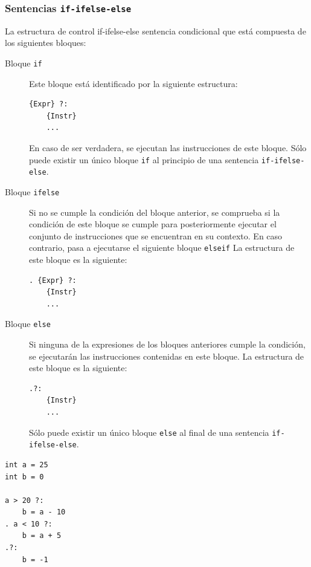 \documentclass[11pt, english]{article}
\begin{document}
\subsubsection{Sentencias \texttt{if-ifelse-else}}
La estructura de control if-ifelse-else sentencia condicional que está compuesta de los siguientes bloques:
\begin{description}
	\item[Bloque \texttt{if}] Este bloque está identificado por la siguiente estructura:
	\begin{center}
\begin{lstlisting}
{Expr} ?:
	{Instr}
	...
\end{lstlisting}
	\end{center}
	En caso de ser verdadera, se ejecutan las instrucciones de este bloque. Sólo puede existir un único bloque \texttt{if} al principio de una sentencia \texttt{if-ifelse-else}.
	\item[Bloque \texttt{ifelse}] Si no se cumple la condición del bloque anterior, se comprueba si la condición de este bloque se cumple para posteriormente ejecutar el conjunto de instrucciones que se encuentran en su contexto. En caso contrario, pasa a ejecutarse el siguiente bloque \texttt{elseif} La estructura de este bloque es la siguiente:
	\begin{center}
\begin{lstlisting}
. {Expr} ?:
	{Instr}
	...
\end{lstlisting}
	\end{center}
	\item[Bloque \texttt{else}] Si ninguna de la expresiones de los bloques anteriores cumple la condición, se ejecutarán las instrucciones contenidas en este bloque. La estructura de este bloque es la siguiente:
	\begin{center}
\begin{lstlisting}
.?:
	{Instr}
	...
\end{lstlisting}
	\end{center}
	Sólo puede existir un único bloque \texttt{else} al final de una sentencia \texttt{if-ifelse-else}.
\end{description}

\begin{lstlisting}[caption=Ejemplo de uso de la sentencia \texttt{if-ifelse-else}]
int a = 25
int b = 0

a > 20 ?:
	b = a - 10
. a < 10 ?:
	b = a + 5
.?:
	b = -1
\end{lstlisting}
\end{document}
